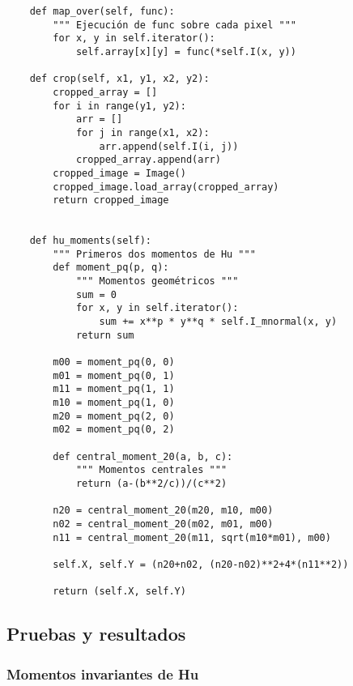 \documentclass[letter]{article}
\begin{document}
\begin{verbatim}
    def map_over(self, func):
        """ Ejecución de func sobre cada pixel """
        for x, y in self.iterator():
            self.array[x][y] = func(*self.I(x, y))

    def crop(self, x1, y1, x2, y2):
        cropped_array = []
        for i in range(y1, y2):
            arr = []
            for j in range(x1, x2):
                arr.append(self.I(i, j))
            cropped_array.append(arr)
        cropped_image = Image()
        cropped_image.load_array(cropped_array)
        return cropped_image


    def hu_moments(self):
        """ Primeros dos momentos de Hu """
        def moment_pq(p, q):
            """ Momentos geométricos """
            sum = 0
            for x, y in self.iterator():
                sum += x**p * y**q * self.I_mnormal(x, y)
            return sum

        m00 = moment_pq(0, 0)
        m01 = moment_pq(0, 1)
        m11 = moment_pq(1, 1)
        m10 = moment_pq(1, 0)
        m20 = moment_pq(2, 0)
        m02 = moment_pq(0, 2)

        def central_moment_20(a, b, c):
            """ Momentos centrales """
            return (a-(b**2/c))/(c**2)

        n20 = central_moment_20(m20, m10, m00)
        n02 = central_moment_20(m02, m01, m00)
        n11 = central_moment_20(m11, sqrt(m10*m01), m00)

        self.X, self.Y = (n20+n02, (n20-n02)**2+4*(n11**2))

        return (self.X, self.Y)
\end{verbatim}
\subsection{Pruebas y resultados}
\label{sec:orgc14e31c}
\subsubsection{Momentos invariantes de Hu}
\label{sec:org8e6a143}
\end{document}

